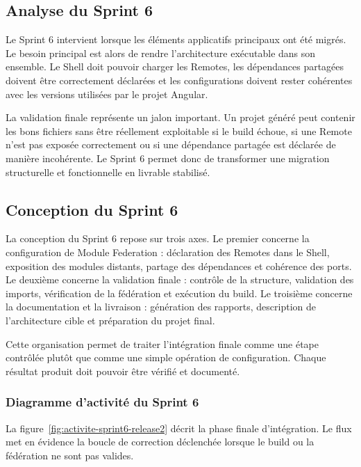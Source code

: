 \subsection{Analyse du Sprint 6}

Le Sprint 6 intervient lorsque les éléments applicatifs principaux ont été migrés. Le besoin principal est alors de rendre l'architecture exécutable dans son ensemble. Le Shell doit pouvoir charger les Remotes, les dépendances partagées doivent être correctement déclarées et les configurations doivent rester cohérentes avec les versions utilisées par le projet Angular.

La validation finale représente un jalon important. Un projet généré peut contenir les bons fichiers sans être réellement exploitable si le build échoue, si une Remote n'est pas exposée correctement ou si une dépendance partagée est déclarée de manière incohérente. Le Sprint 6 permet donc de transformer une migration structurelle et fonctionnelle en livrable stabilisé.

\subsection{Conception du Sprint 6}

La conception du Sprint 6 repose sur trois axes. Le premier concerne la configuration de Module Federation : déclaration des Remotes dans le Shell, exposition des modules distants, partage des dépendances et cohérence des ports. Le deuxième concerne la validation finale : contrôle de la structure, validation des imports, vérification de la fédération et exécution du build. Le troisième concerne la documentation et la livraison : génération des rapports, description de l'architecture cible et préparation du projet final.

Cette organisation permet de traiter l'intégration finale comme une étape contrôlée plutôt que comme une simple opération de configuration. Chaque résultat produit doit pouvoir être vérifié et documenté.



\subsubsection{Diagramme d'activité du Sprint 6}

La figure~\ref{fig:activite-sprint6-release2} décrit la phase finale d'intégration. Le flux met en évidence la boucle de correction déclenchée lorsque le build ou la fédération ne sont pas valides.

